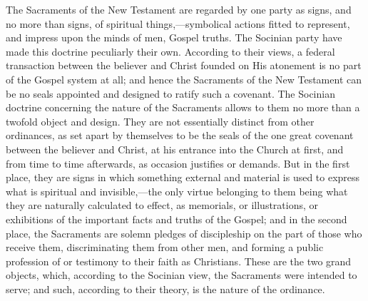 \documentclass[]{book}
\begin{document}
The Sacraments of the New Testament are regarded by one party as signs, and no more than signs, of spiritual things,---symbolical actions fitted to represent, and impress upon the minds of men, Gospel truths. The Socinian party have made this doctrine peculiarly their own. According to their views, a federal transaction between the believer and Christ founded on His atonement is no part of the Gospel system at all; and hence the Sacraments of the New Testament can be no seals appointed and designed to ratify such a covenant. The Socinian doctrine concerning the nature of the Sacraments allows to them no more than a twofold object and design. They are not essentially distinct from other ordinances, as set apart by themselves to be the seals of the one great covenant between the believer and Christ, at his entrance into the Church at first, and from time to time afterwards, as occasion justifies or demands. But in the first place, they are signs in which something external and material is used to express what is spiritual and invisible,---the only virtue belonging to them being what they are naturally calculated to effect, as memorials, or illustrations, or exhibitions of the important facts and truths of the Gospel; and in the second place, the Sacraments are solemn pledges of discipleship on the part of those who receive them, discriminating them from other men, and forming a public profession of or testimony to their faith as Christians. These are the two grand objects, which, according to the Socinian view, the Sacraments were intended to serve; and such, according to their theory, is the nature of the ordinance.
\end{document}
